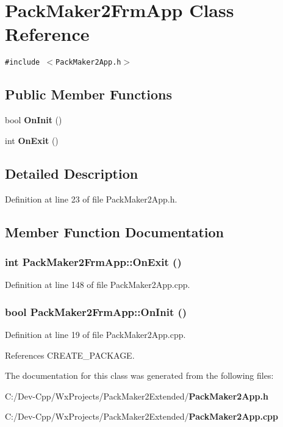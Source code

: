\section{Pack\-Maker2Frm\-App Class Reference}
\label{class_pack_maker2_frm_app}
{\tt \#include $<$Pack\-Maker2App.h$>$}

\subsection*{Public Member Functions}
\begin{CompactItemize}
\item 
bool {\bf On\-Init} ()
\item 
int {\bf On\-Exit} ()
\end{CompactItemize}


\subsection{Detailed Description}




Definition at line 23 of file Pack\-Maker2App.h.

\subsection{Member Function Documentation}
\subsubsection{\setlength{\rightskip}{0pt plus 5cm}int Pack\-Maker2Frm\-App::On\-Exit ()}\label{class_pack_maker2_frm_app_e5af9e7b72bb7b36b841f4020517cbcc}




Definition at line 148 of file Pack\-Maker2App.cpp.
\subsubsection{\setlength{\rightskip}{0pt plus 5cm}bool Pack\-Maker2Frm\-App::On\-Init ()}\label{class_pack_maker2_frm_app_26c4e0437a5375f604e863404bf3187d}




Definition at line 19 of file Pack\-Maker2App.cpp.

References CREATE\_\-PACKAGE.

The documentation for this class was generated from the following files:\begin{CompactItemize}
\item 
C:/Dev-Cpp/Wx\-Projects/Pack\-Maker2Extended/{\bf Pack\-Maker2App.h}\item 
C:/Dev-Cpp/Wx\-Projects/Pack\-Maker2Extended/{\bf Pack\-Maker2App.cpp}\end{CompactItemize}
